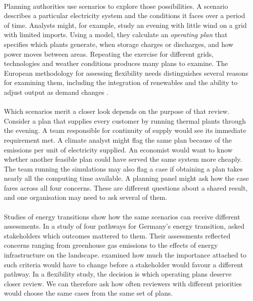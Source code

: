 \documentclass[11pt,a4paper]{article}
\begin{document}
\paragraph{}
Planning authorities use scenarios to explore those possibilities. A scenario describes a particular electricity system and the conditions it faces over a period of time. Analysts might, for example, study an evening with little wind on a grid with limited imports. Using a model, they calculate an \emph{operating plan} that specifies which plants generate, when storage charges or discharges, and how power moves between areas. Repeating the exercise for different grids, technologies and weather conditions produces many plans to examine. The European methodology for assessing flexibility needs distinguishes several reasons for examining them, including the integration of renewables and the ability to adjust output as demand changes \citep{acer2025}.

\paragraph{}
Which scenarios merit a closer look depends on the purpose of that review. Consider a plan that supplies every customer by running thermal plants through the evening. A team responsible for continuity of supply would see its immediate requirement met. A climate analyst might flag the same plan because of the emissions per unit of electricity supplied. An economist would want to know whether another feasible plan could have served the same system more cheaply. The team running the simulations may also flag a case if obtaining a plan takes nearly all the computing time available. A planning panel might ask how the case fares across all four concerns. These are different questions about a shared result, and one organisation may need to ask several of them.

\paragraph{}
Studies of energy transitions show how the same scenarios can receive different assessments. In a study of four pathways for Germany's energy transition, \citet{hofer2020} asked stakeholders which outcomes mattered to them. Their assessments reflected concerns ranging from greenhouse gas emissions to the effects of energy infrastructure on the landscape. \citet{voegele2023} examined how much the importance attached to such criteria would have to change before a stakeholder would favour a different pathway. In a flexibility study, the decision is which operating plans deserve closer review. We can therefore ask how often reviewers with different priorities would choose the same cases from the same set of plans.
\end{document}
